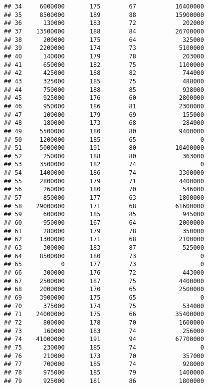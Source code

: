 \documentclass[
]{article}
\begin{document}
\begin{verbatim}
## 34     6000000       175        67           16400000
## 35     8500000       189        88           15900000
## 36      130000       183        72             202000
## 37    13500000       188        84           26700000
## 38      200000       175        64             325000
## 39     2200000       174        73            5100000
## 40      140000       179        78             203000
## 41      650000       182        75            1100000
## 42      425000       188        82             744000
## 43      325000       185        75             488000
## 44      750000       188        85             938000
## 45      925000       176        60            2800000
## 46      950000       186        81            2300000
## 47      100000       179        69             155000
## 48      180000       173        68             284000
## 49     5500000       180        80            9400000
## 50     1200000       185        65                  0
## 51     5000000       191        80           10400000
## 52      250000       188        80             363000
## 53     3500000       182        74                  0
## 54     1400000       186        74            3300000
## 55     2800000       179        71            4400000
## 56      260000       180        70             546000
## 57      850000       177        63            1800000
## 58    29000000       171        68           61600000
## 59      600000       185        85             945000
## 60      950000       167        64            2000000
## 61      280000       179        78             350000
## 62     1300000       171        68            2100000
## 63      300000       183        87             525000
## 64     8500000       180        73                  0
## 65           0       177        73                  0
## 66      300000       176        72             443000
## 67     2500000       187        75            4400000
## 68     2000000       170        65            2500000
## 69     3900000       175        65                  0
## 70      375000       174        75             534000
## 71    24000000       175        66           35400000
## 72      800000       178        70            1600000
## 73      160000       183        74             256000
## 74    41000000       191        94           67700000
## 75      230000       185        74                  0
## 76      210000       173        70             357000
## 77      700000       185        74             928000
## 78      975000       185        79            1400000
## 79      925000       181        86            1800000

\end{verbatim}
\end{document}
